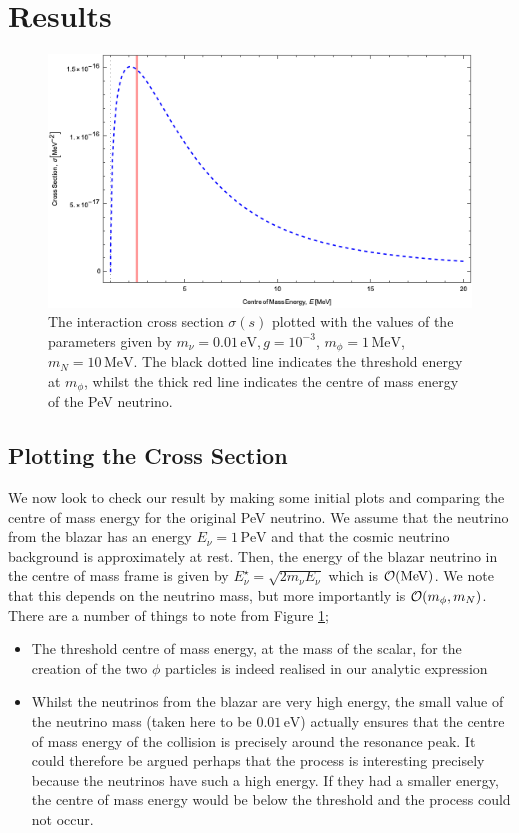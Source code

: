 \documentclass[10pt]{article}
\begin{document}
\section{Results}
\begin{figure}
\begin{framed}
 \centering
 \includegraphics[width=0.7\linewidth]{sigma}
 \caption{The interaction cross section $\sigma(s)$ plotted with the values of the parameters given by $m_\nu = 0.01 \, \text{eV}, g = 10^{-3}$, $m_\phi = 1 \, \text{MeV}$, $m_N = 10 \, \text{MeV}$. The black dotted line indicates the threshold energy at $m_\phi$, whilst the thick red line indicates the centre of mass energy of the PeV neutrino.}
 \label{fig:sigmaplot}
\end{framed}
\end{figure}
\subsection{Plotting the Cross Section}
We now look to check our result by making some initial plots and comparing the centre of mass energy for the original PeV neutrino. We assume that the neutrino from the blazar has an energy $E_\nu = 1 \, \text{PeV}$ and that the cosmic neutrino background is approximately at rest. Then, the energy of the blazar neutrino in the centre of mass frame is given by $E^\star_\nu = \sqrt{2m_\nu E_\nu}$ which is $\mathcal{O}(\text{MeV})$. We note that this depends on the neutrino mass, but more importantly is $\mathcal{O}(m_\phi, m_N)$. There are a number of things to note from Figure \ref{fig:sigmaplot};
\begin{itemize}
\item The threshold centre of mass energy, at the mass of the scalar, for the creation of the two $\phi$ particles is indeed realised in our analytic expression
\item Whilst the neutrinos from the blazar are very high energy, the small value of the neutrino mass (taken here to be $0.01 \, \text{eV}$) actually ensures that the centre of mass energy of the collision is precisely around the resonance peak. It could therefore be argued perhaps that the process is interesting precisely because the neutrinos have such a high energy. If they had a smaller energy, the centre of mass energy would be below the threshold and the process could not occur.
\end{itemize}
\end{document}
